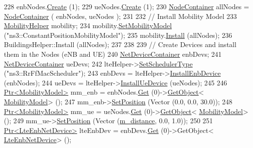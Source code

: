 \begin{DoxyCode}
228   enbNodes.\hyperlink{classns3_1_1NodeContainer_a787f059e2813e8b951cc6914d11dfe69}{Create} (1);
229   ueNodes.\hyperlink{classns3_1_1NodeContainer_a787f059e2813e8b951cc6914d11dfe69}{Create} (1);
230   \hyperlink{classns3_1_1NodeContainer}{NodeContainer} allNodes = \hyperlink{classns3_1_1NodeContainer}{NodeContainer} ( enbNodes, ueNodes );
231   
232   \textcolor{comment}{// Install Mobility Model}
233   \hyperlink{classns3_1_1MobilityHelper}{MobilityHelper} mobility;
234   mobility.\hyperlink{classns3_1_1MobilityHelper_a030275011b6f40682e70534d30280aba}{SetMobilityModel} (\textcolor{stringliteral}{"ns3::ConstantPositionMobilityModel"});
235   mobility.\hyperlink{classns3_1_1MobilityHelper_a07737960ee95c0777109cf2994dd97ae}{Install} (allNodes);
236   BuildingsHelper::Install (allNodes);
237 
238   
239   \textcolor{comment}{// Create Devices and install them in the Nodes (eNB and UE)}
240   \hyperlink{classns3_1_1NetDeviceContainer}{NetDeviceContainer} enbDevs;
241   \hyperlink{classns3_1_1NetDeviceContainer}{NetDeviceContainer} ueDevs;
242   lteHelper->\hyperlink{classns3_1_1LteHelper_a8f86e55b8b80a81732c4b2df00fb25d5}{SetSchedulerType} (\textcolor{stringliteral}{"ns3::RrFfMacScheduler"});
243   enbDevs = lteHelper->\hyperlink{classns3_1_1LteHelper_a5e009ad35ef85f46b5a6099263f15a03}{InstallEnbDevice} (enbNodes);
244   ueDevs = lteHelper->\hyperlink{classns3_1_1LteHelper_ac9cd932d7de92811cfa953c2e3b2fc9f}{InstallUeDevice} (ueNodes);
245   
246   \hyperlink{classns3_1_1Ptr}{Ptr<MobilityModel>} mm\_enb = enbNodes.\hyperlink{classns3_1_1NodeContainer_a9ed96e2ecc22e0f5a3d4842eb9bf90bf}{Get} (0)->\hyperlink{classns3_1_1Object_a13e18c00017096c8381eb651d5bd0783}{GetObject}<
      \hyperlink{classns3_1_1MobilityModel}{MobilityModel}> ();
247   mm\_enb->\hyperlink{classns3_1_1MobilityModel_ac584b3d5a309709d2f13ed6ada1e7640}{SetPosition} (Vector (0.0, 0.0, 30.0));
248   \hyperlink{classns3_1_1Ptr}{Ptr<MobilityModel>} mm\_ue = ueNodes.\hyperlink{classns3_1_1NodeContainer_a9ed96e2ecc22e0f5a3d4842eb9bf90bf}{Get} (0)->\hyperlink{classns3_1_1Object_a13e18c00017096c8381eb651d5bd0783}{GetObject}<
      \hyperlink{classns3_1_1MobilityModel}{MobilityModel}> ();
249   mm\_ue->\hyperlink{classns3_1_1MobilityModel_ac584b3d5a309709d2f13ed6ada1e7640}{SetPosition} (Vector (\hyperlink{classLtePathlossModelSystemTestCase_a445b7e83af806458e058bbc1b8fa692f}{m\_distance}, 0.0, 1.0));
250   
251   \hyperlink{classns3_1_1Ptr}{Ptr<LteEnbNetDevice>} lteEnbDev = enbDevs.\hyperlink{classns3_1_1NetDeviceContainer_a677d62594b5c9d2dea155cc5045f4d0b}{Get} (0)->GetObject<
      \hyperlink{classns3_1_1LteEnbNetDevice}{LteEnbNetDevice}> ();

\end{DoxyCode}
